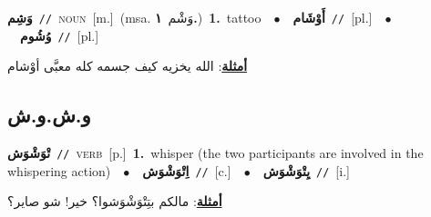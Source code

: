 \documentclass[10pt,a4paper,twoside]{article} %
\begin{document}
\begin{multicols}{2}
{\setlength\topsep{0pt}\textbf{\foreignlanguage{arabic}{وَشِم}}\ {\color{gray}\texttt{//}\color{black}}\ \textsc{noun}\ [m.]\ \color{gray}(msa. \foreignlanguage{arabic}{وَشْم}~\foreignlanguage{arabic}{\textbf{١.}})\color{black}\ \textbf{1.}~tattoo\ \ $\bullet$\ \ \setlength\topsep{0pt}\textbf{\foreignlanguage{arabic}{أَوْشَام}}\ {\color{gray}\texttt{//}\color{black}}\ [pl.]\ \ $\bullet$\ \ \setlength\topsep{0pt}\textbf{\foreignlanguage{arabic}{وُشُوم}}\ {\color{gray}\texttt{//}\color{black}}\ [pl.]\  \begin{flushright}\color{gray}\foreignlanguage{arabic}{\textbf{\underline{\foreignlanguage{arabic}{أمثلة}}}: الله يخزيه كيف جسمه كله معبَّى أوْشام}\end{flushright}\color{black}} \vspace{2mm}

\vspace{-3mm}
\subsection*{\color{blue}\foreignlanguage{arabic}{و.ش.و.ش}\color{blue}{}} 

{\setlength\topsep{0pt}\textbf{\foreignlanguage{arabic}{تْوَشْوَش}}\ {\color{gray}\texttt{//}\color{black}}\ \textsc{verb}\ [p.]\ \textbf{1.}~whisper (the two participants are involved in the whispering action)\ \ $\bullet$\ \ \setlength\topsep{0pt}\textbf{\foreignlanguage{arabic}{اِتْوَشْوَش}}\ {\color{gray}\texttt{//}\color{black}}\ [c.]\ \ $\bullet$\ \ \setlength\topsep{0pt}\textbf{\foreignlanguage{arabic}{يِتْوَشْوَش}}\ {\color{gray}\texttt{//}\color{black}}\ [i.]\  \begin{flushright}\color{gray}\foreignlanguage{arabic}{\textbf{\underline{\foreignlanguage{arabic}{أمثلة}}}: مالكم بتِتْوَشْوَشوا؟ خير! شو صاير؟}\end{flushright}\color{black}} \vspace{2mm}


\end{multicols}
\end{document}
